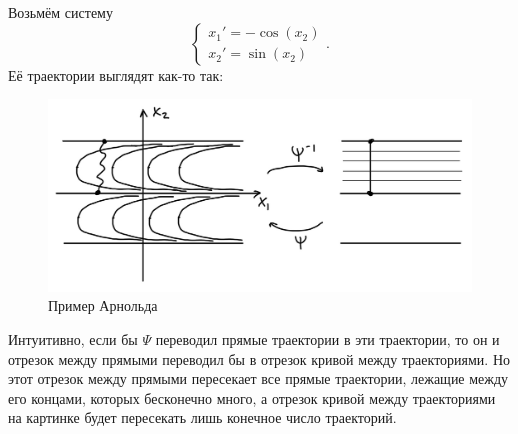 \begin{itemize}
    Возьмём систему
    \[
        \begin{cases}
            x_1' = -\cos(x_2)\\
            x_2' = \sin(x_2)
        \end{cases}.
    \]
    Её траектории выглядят как-то так:
    \begin{figure}[h]
        \includegraphics[scale=0.25]{arnold-example}
        \centering
        \caption{Пример Арнольда}
    \end{figure}

    Интуитивно, если бы $\Psi$ переводил прямые траектории в эти траектории, то он и отрезок между прямыми переводил бы в отрезок кривой между траекториями. Но этот отрезок между прямыми пересекает все прямые траектории, лежащие между его концами, которых бесконечно много, а
    отрезок кривой между траекториями на картинке будет пересекать лишь конечное число траекторий.
\end{itemize}

